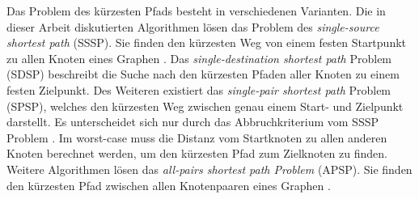 Das Problem des kürzesten Pfads besteht in verschiedenen Varianten. Die in dieser Arbeit diskutierten Algorithmen lösen das Problem des \textit{single-source shortest path} (SSSP). Sie finden den kürzesten Weg von einem festen Startpunkt zu allen Knoten eines Graphen \cite{Gu.2018}. Das \textit{single-destination shortest path} Problem (SDSP)  beschreibt die Suche nach den kürzesten Pfaden aller Knoten zu einem festen Zielpunkt. Des Weiteren existiert das \textit{single-pair shortest path} Problem (SPSP), welches den kürzesten Weg zwischen genau einem Start- und Zielpunkt darstellt. Es unterscheidet sich nur durch das Abbruchkriterium vom SSSP Problem \cite{Ottmann.2017}. Im worst-case muss die Distanz vom Startknoten zu allen anderen Knoten berechnet werden, um den kürzesten Pfad zum Zielknoten zu finden. Weitere Algorithmen lösen das \textit{all-pairs shortest path Problem} (APSP). Sie finden den kürzesten Pfad zwischen allen Knotenpaaren eines Graphen \cite{Cormen.2009}.